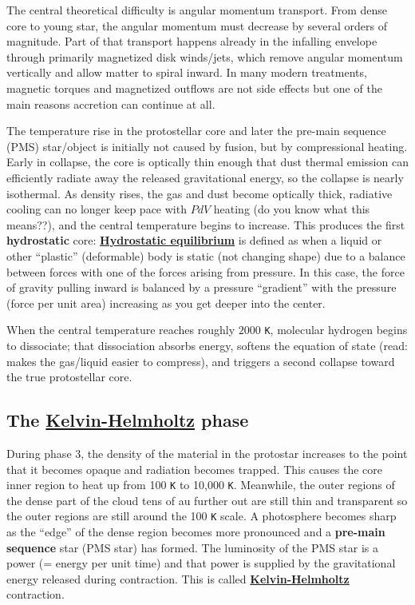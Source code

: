 \documentclass[11pt]{article}
\begin{document}
The central theoretical difficulty is angular momentum transport. From
dense core to young star, the angular momentum must decrease by several
orders of magnitude. Part of that transport happens already in the
infalling envelope through primarily magnetized disk winds/jets, which
remove angular momentum vertically and allow matter to spiral inward. In
many modern treatments, magnetic torques and magnetized outflows are not
side effects but one of the main reasons accretion can continue at all.

The temperature rise in the protostellar core and later the pre-main
sequence (PMS) star/object is initially not caused by fusion, but by
compressional heating. Early in collapse, the core is optically thin
enough that dust thermal emission can efficiently radiate away the
released gravitational energy, so the collapse is nearly isothermal. As
density rises, the gas and dust become optically thick, radiative
cooling can no longer keep pace with \(PdV\) heating (do you know what
this means??), and the central temperature begins to increase. This
produces the first \textbf{hydrostatic} core:
\href{https://en.wikipedia.org/wiki/Hydrostatic_equilibrium}{\textbf{Hydrostatic
equilibrium}} is defined as when a liquid or other ``plastic''
(deformable) body is static (not changing shape) due to a balance
between forces with one of the forces arising from pressure. In this
case, the force of gravity pulling inward is balanced by a pressure
``gradient'' with the pressure (force per unit area) increasing as you
get deeper into the center.

When the central temperature reaches roughly \(2000\) \texttt{K},
molecular hydrogen begins to dissociate; that dissociation absorbs
energy, softens the equation of state (read: makes the gas/liquid easier
to compress), and triggers a second collapse toward the true
protostellar core.

    \subsection{\texorpdfstring{The
\href{https://en.wikipedia.org/wiki/Kelvin–Helmholtz_mechanism}{Kelvin-Helmholtz}
phase}{The Kelvin-Helmholtz phase}}\label{the-kelvin-helmholtz-phase}

During phase 3, the density of the material in the protostar increases
to the point that it becomes opaque and radiation becomes trapped. This
causes the core inner region to heat up from 100 \texttt{K} to 10,000
\texttt{K}. Meanwhile, the outer regions of the dense part of the cloud
tens of au further out are still thin and transparent so the outer
regions are still around the 100 \texttt{K} scale. A photosphere becomes
sharp as the ``edge'' of the dense region becomes more pronounced and a
\textbf{pre-main sequence} star (PMS star) has formed. The luminosity of
the PMS star is a power (= energy per unit time) and that power is
supplied by the gravitational energy released during contraction. This
is called
\href{https://en.wikipedia.org/wiki/Kelvin–Helmholtz_mechanism}{\textbf{Kelvin-Helmholtz}}
contraction.
\end{document}
